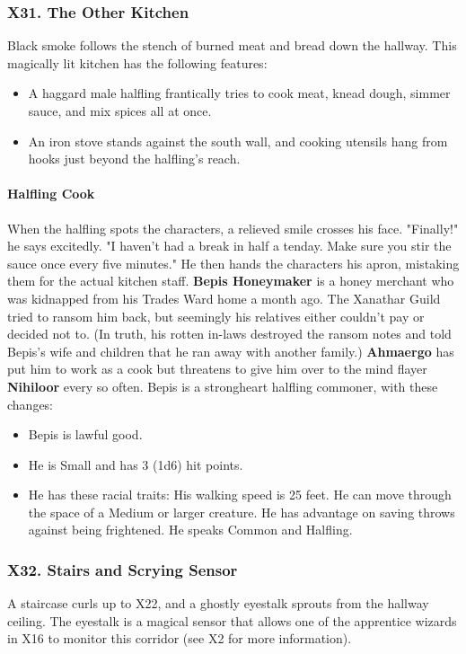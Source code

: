\documentclass[10pt,a4paper,twoside,twocolumn,openany,nodeprecatedcode]{dndbook}
\begin{document}
\subsubsection{X31. The Other Kitchen}
Black smoke follows the stench of burned meat and bread down the hallway. This magically lit kitchen has the following features:
\begin{itemize}

\item A haggard male halfling frantically tries to cook meat, knead dough, simmer sauce, and mix spices all at once.
\item An iron stove stands against the south wall, and cooking utensils hang from hooks just beyond the halfling's reach.
\end{itemize}


\paragraph{Halfling Cook}
When the halfling spots the characters, a relieved smile crosses his face. "Finally!" he says excitedly. "I haven't had a break in half a tenday. Make sure you stir the sauce once every five minutes." He then hands the characters his apron, mistaking them for the actual kitchen staff.
\textbf{Bepis Honeymaker} is a honey merchant who was kidnapped from his Trades Ward home a month ago. The Xanathar Guild tried to ransom him back, but seemingly his relatives either couldn't pay or decided not to. (In truth, his rotten in-laws destroyed the ransom notes and told Bepis's wife and children that he ran away with another family.) \textbf{Ahmaergo} has put him to work as a cook but threatens to give him over to the mind flayer \textbf{Nihiloor} every so often.
Bepis is a strongheart halfling commoner, with these changes:
\begin{itemize}

\item Bepis is lawful good.
\item He is Small and has 3 (1d6) hit points.
\item He has these racial traits: His walking speed is 25 feet. He can move through the space of a Medium or larger creature. He has advantage on saving throws against being frightened. He speaks Common and Halfling.
\end{itemize}


\subsubsection{X32. Stairs and Scrying Sensor}
A staircase curls up to X22, and a ghostly eyestalk sprouts from the hallway ceiling. The eyestalk is a magical sensor that allows one of the apprentice wizards in X16 to monitor this corridor (see X2 for more information).
\end{document}
